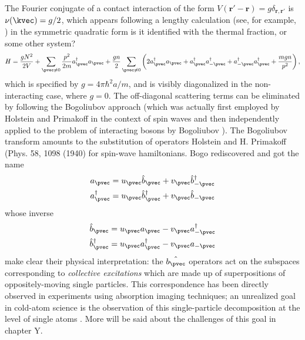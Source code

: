 {{{{{{	The Fourier conjugate of a contact interaction of the form $V(\textbf{r}'-\textbf{r})=g\delta_{\textbf{r},\textbf{r}'}$ is $\nu(\kvec)=g/2$, which appears 	following a lengthy calculation (see, for example, \cite{PitaevskiiStringari}) in the symmetric quadratic form
	is it identified with the thermal fraction, or some other system?
	\begin{equation}
		H = \frac{gN^2}{2V} + \sum_{\pvec\neq0}\frac{p^2}{2m}a^\dagger_\pvec a_\pvec + \frac{gn}{2}\sum_{\pvec\neq0}\left(2a^\dagger_\pvec a_\pvec + a^\dagger_\pvec a^\dagger_{-\pvec} + a^\dagger_{-\pvec} a^\dagger_{\pvec} + \frac{mgn}{p^2}\right),
		\label{eqn:bog_H}
	\end{equation}
	which is specified by $g=4\pi\hbar^2a/m$, and is visibly diagonalized in the non-interacting case, where $g=0$.
	The off-diagonal scattering terms can be eliminated by following the Bogoliubov approach (which was actually first employed by Holstein and Primakoff in the context of spin waves \cite{Schwabl} and then independently applied to the problem of interacting bosons by Bogoliubov \cite{Bologiubov47}).
	The Bogoliubov transform amounts to the substitution of operators
	Holstein and H.
	Primakoff (Phys.
	58, 1098 (1940) for spin-wave hamiltonians.
	Bogo rediscovered and got the name
	\begin{align}
		a_\pvec &= u_\pvec \hat{b}_\pvec + v_\pvec \hat{b}^\dagger_{-\pvec}\\
		a_\pvec^\dagger &= u_\pvec\hat{b}_\pvec^\dagger + v_\pvec \hat{b}_{-\pvec}
		\label{bogotrans}
	\end{align}
	whose inverse
	\begin{align}
		\hat{b}_\pvec &= u_\pvec a_\pvec - v_\pvec a^\dagger_{-\pvec}\\
		\hat{b}_\pvec^\dagger &= u_\pvec a_\pvec^\dagger - v_\pvec a_{-\pvec}
		\label{bogoinverse}
	\end{align}
	make clear their physical interpretation: the $\hat{b_\pvec}$ operators act on the subspaces corresponding to \emph{collective excitations} which are made up of superpositions of oppositely-moving single particles.
	This correspondence has been directly observed in experiments \cite{Vogels02} using absorption imaging techniques; an unrealized goal in cold-atom science is the observation of this single-particle decomposition at the level of single atoms .
	More will be said about the challenges of this goal in chapter Y.
	
}}}}}}

